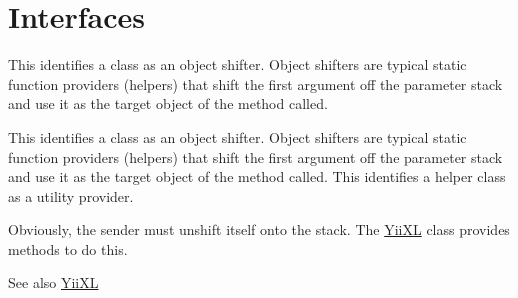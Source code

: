 \hypertarget{group__interfaces}{
\section{Interfaces}
\label{group__interfaces}
}


This identifies a class as an object shifter. Object shifters are typical static function providers (helpers) that shift the first argument off the parameter stack and use it as the target object of the method called.  


This identifies a class as an object shifter. Object shifters are typical static function providers (helpers) that shift the first argument off the parameter stack and use it as the target object of the method called. This identifies a helper class as a utility provider.

Obviously, the sender must unshift itself onto the stack. The \hyperlink{classYiiXL}{YiiXL} class provides methods to do this. \begin{DoxySeeAlso}{See also}
\hyperlink{classYiiXL}{YiiXL} 
\end{DoxySeeAlso}
